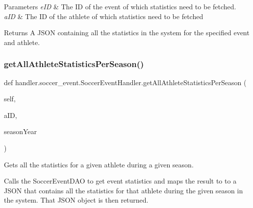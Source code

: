 \begin{DoxyParams}{Parameters}
{\em e\+ID} & The ID of the event of which statistics need to be fetched. \\
\hline
{\em a\+ID} & The ID of the athlete of which statistics need to be fetched\\
\hline
\end{DoxyParams}
\begin{DoxyReturn}{Returns}
A J\+S\+ON containing all the statistics in the system for the specified event and athlete. 
\end{DoxyReturn}
\mbox{\label{classhandler_1_1soccer__event_1_1_soccer_event_handler_a3a100777cb6277419240d85cf05c8ebc}} 
\subsubsection{\texorpdfstring{get\+All\+Athlete\+Statistics\+Per\+Season()}{getAllAthleteStatisticsPerSeason()}}
{\footnotesize\ttfamily def handler.\+soccer\+\_\+event.\+Soccer\+Event\+Handler.\+get\+All\+Athlete\+Statistics\+Per\+Season (\begin{DoxyParamCaption}\item[{}]{self,  }\item[{}]{a\+ID,  }\item[{}]{season\+Year }\end{DoxyParamCaption})}



Gets all the statistics for a given athlete during a given season. 

Calls the Soccer\+Event\+D\+AO to get event statistics and maps the result to to a J\+S\+ON that contains all the statistics for that athlete during the given season in the system. That J\+S\+ON object is then returned.


